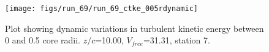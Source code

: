 \begin{figure}[H]
\centering
\texttt{[image: figs/run\_69/run\_69\_ctke\_005rdynamic]}
\caption{Plot showing dynamic variations in turbulent kinetic energy between 0 and 0.5 core radii. $z/c$=10.00, $V_{free}$=31.31, station 7.}
\label{fig:run_69_ctke_005rdynamic}
\end{figure}


